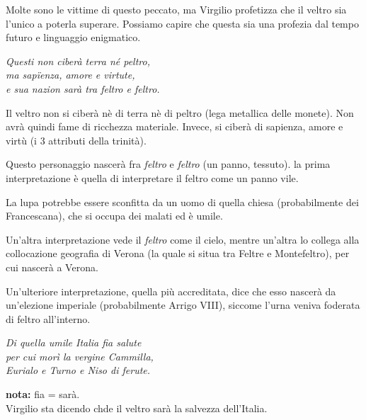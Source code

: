 \documentclass[a4paper]{article}
\begin{document}
Molte sono le vittime di questo peccato, ma Virgilio profetizza che il veltro sia l'unico
a poterla superare.
Possiamo capire che questa sia una profezia dal tempo futuro e linguaggio enigmatico.

\begin{center}
    \textit{Questi non ciberà terra né peltro,} \\
    \textit{ma sapïenza, amore e virtute,} \\
    \textit{e sua nazion sarà tra feltro e feltro.}
\end{center}


Il veltro non si ciberà nè di terra nè di peltro (lega metallica delle monete).
Non avrà quindi fame di ricchezza materiale.
Invece, si ciberà di sapienza, amore e virtù (i 3 attributi della trinità).

Questo personaggio nascerà fra \textit{feltro} e \textit{feltro} (un panno, tessuto).
la prima interpretazione è quella di interpretare il feltro come un panno vile.


La lupa potrebbe essere sconfitta da un uomo di quella chiesa (probabilmente dei Francescana),
che si occupa dei malati ed è umile.

Un'altra interpretazione vede il \textit{feltro} come il cielo,
mentre un'altra lo collega alla collocazione geografia di Verona (la quale si
situa tra Feltre e Montefeltro), per cui nascerà a Verona.

Un'ulteriore interpretazione, quella più accreditata, dice che esso nascerà da un'elezione imperiale
(probabilmente Arrigo VIII), siccome l'urna veniva foderata di feltro all'interno.

\begin{center}
    \textit{Di quella umile Italia fia salute} \\
    \textit{per cui morì la vergine Cammilla,} \\
    \textit{Eurialo e Turno e Niso di ferute.}
\end{center}

\textbf{\color{red}nota:} fia = sarà. \\
Virgilio sta dicendo chde il veltro sarà la salvezza dell'Italia.
\end{document}

